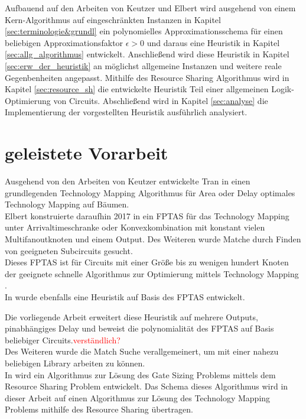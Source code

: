 \documentclass[11pt, a4paper, german]{article}
\newcommand{\TM}{Technology  Mapping }
\begin{document}
Aufbauend auf den Arbeiten von Keutzer \cite{DAGON} und  Elbert \cite{Elbert} wird ausgehend von einem Kern-Algorithmus auf eingeschränkten Instanzen in Kapitel \ref{sec:terminologie&grundl} ein polynomielles Approximationsschema für einen beliebigen Approximationsfaktor $\epsilon > 0$ und daraus eine Heuristik in Kapitel \ref{sec:allg_algorithmus} entwickelt. Anschließend wird diese Heuristik  in Kapitel \ref{sec:erw_der_heuristik} an möglichst allgemeine Instanzen und weitere reale Gegenbenheiten angepasst. Mithilfe des Resource Sharing Algorithmus wird in Kapitel \ref{sec:resource_sh} die entwickelte Heuristik Teil einer allgemeinen Logik-Optimierung von Circuits. Abschließend wird in Kapitel \ref{sec:analyse} die Implementierung der vorgestellten Heuristik ausführlich analysiert.

\section{geleistete Vorarbeit}
Ausgehend von den Arbeiten von Keutzer \cite{DAGON} entwickelte Tran in \cite{Tran} einen grundlegenden \TM Algorithmus f\"ur Area oder Delay optimales \TM auf B\"aumen.\\
Elbert konstruierte daraufhin 2017 in \cite{Elbert} ein FPTAS f\"ur das \TM unter Arrivaltimeschranke oder Konvexkombination mit konstant vielen Multifanoutknoten und einem Output. Des Weiteren wurde Matche durch Finden von geeigneten Subcircuits gesucht.\\
Dieses FPTAS ist f\"ur Circuits mit einer Gr\"o{\ss}e bis zu wenigen hundert Knoten der geeignete schnelle Algorithmus zur Optimierung mittels \TM.\\
In \cite{Elbert} wurde ebenfalls eine Heuristik auf Basis des FPTAS entwickelt. 

Die vorliegende Arbeit erweitert diese Heuristik auf mehrere Outputs, pinabhängiges Delay und beweist die polynomialit\"at des FPTAS auf Basis beliebiger Circuits.\textcolor{red}{verst\"andlich?}\\ Des Weiteren wurde die Match Suche verallgemeinert, um mit einer nahezu beliebigen Library arbeiten zu k\"onnen.\\

In \cite{Daboul2018} wird ein Algorithmus zur L\"osung des Gate Sizing Problems mittels dem Resource Sharing Problem entwickelt. Das Schema dieses Algorithmus wird in dieser Arbeit auf einen Algorithmus zur L\"osung des \TM Problems mithilfe des Resource Sharing \"ubertragen.
\end{document}
